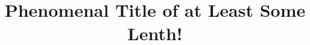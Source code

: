 \documentclass[english]{fhnwfactsheet}
\title{Phenomenal Title of at Least Some Lenth!}
\begin{document}
    \makefactsheet
\end{document}
